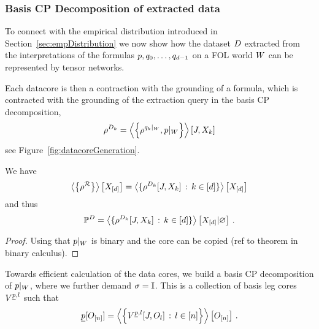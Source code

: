 \subsubsection{Basis CP Decomposition of extracted data}

To connect with the empirical distribution introduced in Section~\ref{sec:empDistribution} we now show how the dataset $D$ extracted from the interpretations of the formulas $p,q_{0},\ldots,q_{d-1}$ on a FOL world $W$ can be represented by tensor networks.



Each datacore is then a contraction with the grounding of a formula, which is contracted with the grounding of the extraction query in the basis CP decomposition, 
\begin{align*}
	\rho^{D_{k}} = \left\langle \left\{\rho^{{q_{k}}|_{W}},{p}|_{W}\right\}\right\rangle \left[ J,X_{k} \right] 
\end{align*}
see Figure~\ref{fig:datacoreGeneration}.

\begin{theorem}	
	We have
		\[ 	\left\langle \left\{\rho^{\mathcal{R}}\right\}\right\rangle \left[ X_{[d]} \right] 
		= \left\langle \{\rho^{D_{k}}[J,X_{k}] \, : \, k\in[d]\}\right\rangle \left[ X_{[d]} \right] \]
	and thus 
		\[  \mathbb{P}^{D} = \left\langle \{\rho^{D_{k}}[J,X_{k}]  \, : \, k\in[d]\}\right\rangle \left[ X_{[d]} | \varnothing \right] \, . \]
\end{theorem}
\begin{proof}
	Using that ${p}|_{W}$ is binary and the core can be copied (ref to theorem in binary calculus).
\end{proof}

Towards efficient calculation of the data cores, we build a basis CP decomposition of ${p}|_{W}$, where we further demand $\sigma=\mathbb{I}$.
This is a collection of basis leg cores $V^{\underline{p},l}$ such that
\begin{align*}
	\underline{p}[O_{[n]}] = \left\langle  \left\{ V^{\underline{p},l}[J,O_{l}] \, : \, l\in[n] \right\} \right\rangle \left[ O_{[n]} \right] \, . 
\end{align*}

